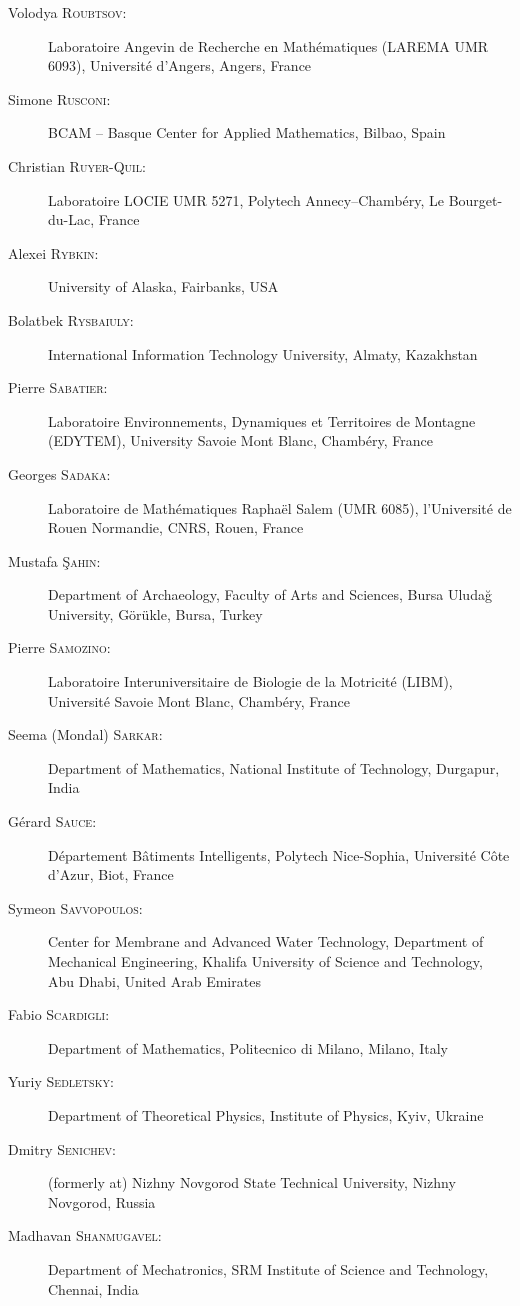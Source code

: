 \documentclass[final, a4paper, oneside, 12pt]{article}
\numberwithin{equation}{section}
\begin{document}
\begin{description}
  \item[Volodya \textsc{Roubtsov}:] Laboratoire Angevin de Recherche en Math\'ematiques (LAREMA UMR 6093), Universit\'e d'Angers, Angers, France
  \item[Simone \textsc{Rusconi}:] BCAM -- Basque Center for Applied Mathematics, Bilbao, Spain
  \item[Christian \textsc{Ruyer-Quil}:] Laboratoire LOCIE UMR 5271, Polytech Annecy--Chamb\'ery, Le Bourget-du-Lac, France
  \item[Alexei \textsc{Rybkin}:] University of Alaska, Fairbanks, USA
  \item[Bolatbek \textsc{Rysbaiuly}:] International Information Technology University, Almaty, Kazakhstan
  \item[Pierre \textsc{Sabatier}:] Laboratoire Environnements, Dynamiques et Territoires de Montagne (EDYTEM), University Savoie Mont Blanc, Chamb\'ery, France
  \item[Georges \textsc{Sadaka}:] Laboratoire de Math\'ematiques Rapha\"el Salem (UMR 6085), l'Universit\'e de Rouen Normandie, CNRS, Rouen, France
  \item[Mustafa \textsc{\c{S}ahin}:] Department of Archaeology, Faculty of Arts and Sciences, Bursa Uluda\u{g} University, G\"or\"ukle, Bursa, Turkey
  \item[Pierre \textsc{Samozino}:] Laboratoire Interuniversitaire de Biologie de la Motricit\'e (LIBM), Universit\'e Savoie Mont Blanc, Chamb\'ery, France
  \item[Seema (Mondal) \textsc{Sarkar}:] Department of Mathematics, National Institute of Technology, Durgapur, India
  \item[G\'erard \textsc{Sauce}:] D\'epartement B\^atiments Intelligents, Polytech Nice-Sophia, Universit\'e C\^ote d'Azur, Biot, France
  \item[Symeon \textsc{Savvopoulos}:] Center for Membrane and Advanced Water Technology, Department of Mechanical Engineering, Khalifa University of Science and Technology, Abu Dhabi, United Arab Emirates
  \item[Fabio \textsc{Scardigli}:] Department of Mathematics, Politecnico di Milano, Milano, Italy
  \item[Yuriy \textsc{Sedletsky}:] Department of Theoretical Physics, Institute of Physics, Kyiv, Ukraine
  \item[Dmitry \textsc{Senichev}:] (formerly at) Nizhny Novgorod State Technical University, Nizhny Novgorod, Russia
  \item[Madhavan \textsc{Shanmugavel}:] Department of Mechatronics, SRM Institute of Science and Technology, Chennai, India

\end{description}
\end{document}

